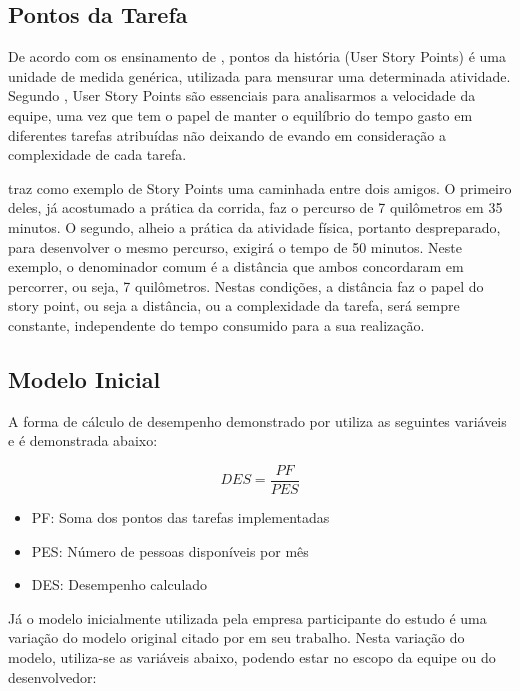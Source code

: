 \subsection{Pontos da Tarefa}
De acordo com os ensinamento de , pontos da história (User Story Points) é uma unidade de medida genérica, utilizada para mensurar uma determinada atividade. Segundo , User Story Points são essenciais para analisarmos a velocidade da equipe, uma vez que tem o papel de manter o equilíbrio do tempo gasto em diferentes tarefas atribuídas não deixando de evando em consideração a complexidade de cada tarefa.\par
{} traz como exemplo de Story Points uma caminhada entre dois amigos. O primeiro deles, já acostumado a prática da corrida, faz o percurso de 7 quilômetros em 35 minutos. O segundo, alheio a prática da atividade física, portanto despreparado, para desenvolver o mesmo percurso, exigirá o tempo de 50 minutos. Neste exemplo, o denominador comum é a distância que ambos concordaram em percorrer, ou seja, 7 quilômetros. Nestas condições, a distância faz o papel do story point, ou seja a distância, ou a complexidade da tarefa, será sempre constante, independente do tempo consumido para a sua realização.

\subsection{Modelo Inicial}
A forma de cálculo de desempenho demonstrado por \citeauthor{barbaran1998indicadores} utiliza as seguintes variáveis e é demonstrada abaixo:

\bigskip

\begin{equation}
    DES = \frac{PF}{PES}
\end{equation}

\begin{itemize}
    \item PF: Soma dos pontos das tarefas implementadas
    \item PES: Número de pessoas disponíveis por mês
    \item DES: Desempenho calculado
\end{itemize}

\bigskip

Já o modelo inicialmente utilizada pela empresa participante do estudo é uma variação do modelo original citado por \citeauthor{barbaran1998indicadores} em seu trabalho. Nesta variação do modelo, utiliza-se as variáveis abaixo, podendo estar no escopo da equipe ou do desenvolvedor:
\bigskip

